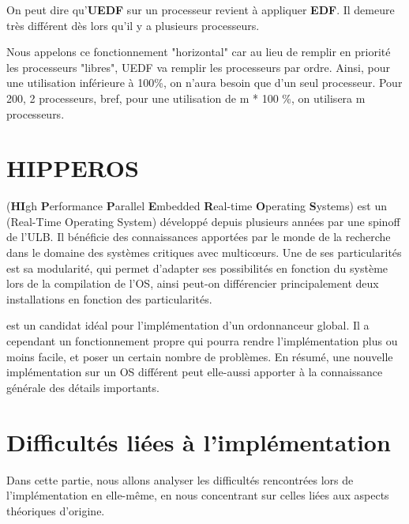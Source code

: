 		On peut dire qu'\textbf{UEDF} sur un processeur revient à appliquer \textbf{EDF}. Il 
		demeure très différent dès lors qu'il y a plusieurs processeurs.
		
		
		
		Nous appelons ce fonctionnement "horizontal" car au lieu de remplir 
		en priorité les processeurs "libres", UEDF va remplir les 
		processeurs par ordre. Ainsi, pour une utilisation inférieure à 100\%, 
		on n'aura besoin que d'un seul processeur. Pour 200, 2 processeurs, bref, 
		pour une utilisation de m * 100 \%, on utilisera m processeurs.
		
		
\section{HIPPEROS}
	 (\textbf{HI}gh \textbf{P}erformance \textbf{P}arallel \textbf{E}mbedded \textbf{R}eal-time \textbf{O}perating \textbf{S}ystems)
	est un  (Real-Time Operating System) développé depuis plusieurs années par une spinoff de l'ULB.
	Il bénéficie des connaissances apportées par le monde de la recherche dans 
	le domaine des systèmes critiques avec multic\oe{}urs. Une de ses particularités 
	est sa modularité, qui permet d'adapter ses possibilités en fonction du système 
	lors de la compilation de l'OS, ainsi peut-on différencier principalement 
	deux installations en fonction des particularités. 
	
	 est un candidat idéal pour l'implémentation d'un ordonnanceur 
	global. Il a cependant un fonctionnement propre qui pourra rendre l'implémentation 
	plus ou moins facile, et poser un certain nombre de problèmes. 
	En résumé, une nouvelle implémentation sur un OS différent 
	peut elle-aussi apporter à la connaissance générale des détails importants.
		

\section{Difficultés liées à l'implémentation}

	Dans cette partie, nous allons analyser les difficultés rencontrées lors de l'implémentation en elle-même, 
	en nous concentrant sur celles liées aux aspects théoriques d'origine. 

